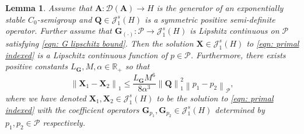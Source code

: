 \documentclass{amsart}
\newcommand{\sJ}{\mathscr J}
\newcommand{\p}[1]{\left( {#1} \right)}
\newcommand{\norm}[1]{\left\| #1 \right\|}
\newcommand{\sP}{\mathcal{P}}
\newcommand{\bA}{\mathbf A}
\newcommand{\bX}{\mathbf X}
\newcommand{\bQ}{\mathbf Q}
\newcommand{\bG}{\mathbf G}
\newtheorem{lemma}{Lemma}
\begin{document}
\begin{lemma} \label{lemma: continuity wrt G}
    Assume that $\bA: \mathcal D(\bA) \rightarrow H$ is the generator of an exponentially stable $C_0$-semigroup and $\bQ \in \sJ_1^s(H)$ is a symmetric positive semi-definite operator. Further assume that $\bG_{\p{\cdot}} : \sP \rightarrow \sJ_1^s(H)$ is Lipshitz continuous on $\sP$ satisfying \eqref{eqn: G lipschitz bound}. Then the solution $\bX\in \sJ_1^s(H)$ to \eqref{eqn: primal indexed} is a Lipschitz continuous function of $p\in \sP$. Furthermore, there exists positive constants $L_{\bG}, M,\alpha \in \mathbb R_+$ so that
    $$
        \norm{\bX_1 - \bX_2}_{1} \leq \frac{L_{\bG}M^6}{8\alpha^3} \norm{\bQ}^2_{1} \norm{p_1 - p_2}_{\sP},
    $$
    where we have denoted $\bX_1, \bX_2 \in \sJ_1^s(H)$ to be the solution to \eqref{eqn: primal indexed} with the coefficient operators $\bG_{p_1}, \bG_{p_2} \in \sJ_1^s(H)$ determined by $p_1, p_2 \in \sP$ respectively.
\end{lemma}
\end{document}
